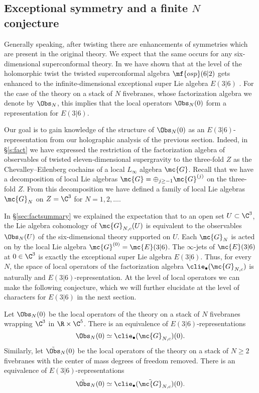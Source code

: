 \subsection{Exceptional symmetry and a finite $N$ conjecture}

Generally speaking, after twisting there are enhancements of symmetries which are present in the original theory. 
We expect that the same occurs for any six-dimensional superconformal theory. 
In \cite{SW6d} we have shown that at the level of the holomorphic twist the twisted superconformal algebra $\mf{osp}(6|2)$ gets enhanced to the infinite-dimensional exceptional super Lie algebra $E(3|6)$ \cite{KacClass}. 
For the case of the theory on a stack of $N$ fivebranes, whose factorization algebra we denote by $\Obs_N$, this implies that the local operators $\Obs_{N}(0)$ form a representation for $E(3|6)$.

Our goal is to gain knowledge of the structure of $\Obs_N(0)$ as an $E(3|6)$-representation from our holographic analysis of the previous section.
Indeed, in \S \ref{s:fact} we have expressed the restriction of the factorization algebra of observables of twisted eleven-dimensional supergravity to the three-fold $Z$ as the Chevalley--Eilenberg cochains of a local $L_\infty$ algebra $\mc{G}$. 
Recall that we have a decomposition of local Lie algebras $\mc{G} = \oplus_{j \geq -1} \mc{G}^{(j)}$ on the three-fold $Z$. 
From this decomposition we have defined a family of local Lie algebras $\mc{G}_{N}$ on $Z = \C^3$ for $N=1,2,\ldots$.

In \S \ref{sec:factsummary} we explained the expectation that to an open set $U \subset \C^3$, the Lie algebra cohomology of $\mc{G}_{N,c}(U)$ is equivalent to the observables $\Obs_N(U)$ of the six-dimensional theory supported on $U$. 
Each $\mc{G}_N$ is acted on by the local Lie algebra $\mc{G}^{(0)} = \mc{E}(3|6)$.
The $\infty$-jets of $\mc{E}(3|6)$ at $0 \in \C^3$ is exactly the exceptional super Lie algebra $E(3|6)$.  
Thus, for every $N$, the space of local operators of the factorization algebra $\clie_\bullet(\mc{G}_{N,c})$ is naturally and $E(3|6)$-representation. 
At the level of local operators we can make the following conjecture, which we will further elucidate at the level of characters for $E(3|6)$ in the next section.

\begin{conj}
\label{conj:ops}
Let $\Obs_N(0)$ be the local operators of the theory on a stack of $N$ fivebranes wrapping $\C^3$ in $\R \times \C^5$. 
There is an equivalence of $E(3|6)$-representations
\begin{equation}
\Obs_N(0) \simeq \clie_\bullet (\mc{G}_{N,c}) (0) .
\end{equation}
Similarly, let $\tilde \Obs_{N}(0)$ be the local operators of the theory on a stack of $N \geq 2$ fivebranes with the center of mass degrees of freedom removed. 
There is an equivalence of $E(3|6)$-representations
\begin{equation}
\tilde \Obs_N(0) \simeq \clie_\bullet (\tilde{\mc{G}}_{N,c}) (0) .
\end{equation}
\end{conj}


